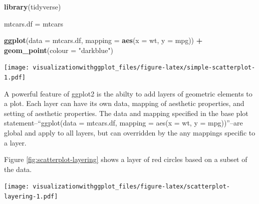 \documentclass[]{krantz}
\makeatletter
\newenvironment{Shaded}{\begin{snugshade}}{\end{snugshade}}
\newcommand{\DataTypeTok}[1]{\textcolor[rgb]{0.13,0.29,0.53}{#1}}
\newcommand{\DecValTok}[1]{\textcolor[rgb]{0.00,0.00,0.81}{#1}}
\newcommand{\KeywordTok}[1]{\textcolor[rgb]{0.13,0.29,0.53}{\textbf{#1}}}
\newcommand{\NormalTok}[1]{#1}
\newcommand{\OperatorTok}[1]{\textcolor[rgb]{0.81,0.36,0.00}{\textbf{#1}}}
\newcommand{\StringTok}[1]{\textcolor[rgb]{0.31,0.60,0.02}{#1}}
\newenvironment{kframe}{%
\medskip{}
\setlength{\fboxsep}{.8em}
 \def\at@end@of@kframe{}%
 \ifinner\ifhmode%
  \def\at@end@of@kframe{\end{minipage}}%
  \begin{minipage}{\columnwidth}%
 \fi\fi%
 \def\FrameCommand##1{\hskip\@totalleftmargin \hskip-\fboxsep
 \colorbox{shadecolor}{##1}\hskip-\fboxsep
     \hskip-\linewidth \hskip-\@totalleftmargin \hskip\columnwidth}%
 \MakeFramed {\advance\hsize-\width
   \@totalleftmargin\z@ \linewidth\hsize
   \@setminipage}}%
 {\par\unskip\endMakeFramed%
 \at@end@of@kframe}
\renewenvironment{Shaded}{\begin{kframe}}{\end{kframe}}
\makeatother
\begin{document}
\begin{Shaded}
\begin{Highlighting}[]
\KeywordTok{library}\NormalTok{(tidyverse)}

\NormalTok{mtcars.df =}\StringTok{ }\NormalTok{mtcars}

\KeywordTok{ggplot}\NormalTok{(}\DataTypeTok{data =}\NormalTok{ mtcars.df, }\DataTypeTok{mapping =} \KeywordTok{aes}\NormalTok{(}\DataTypeTok{x =}\NormalTok{ wt, }\DataTypeTok{y =}\NormalTok{ mpg)) }\OperatorTok{+}
\StringTok{  }\KeywordTok{geom_point}\NormalTok{(}\DataTypeTok{colour =} \StringTok{"darkblue"}\NormalTok{)}
\end{Highlighting}
\end{Shaded}

\texttt{[image: visualizationwithggplot\_files/figure-latex/simple-scatterplot-1.pdf]}

A powerful feature of ggplot2 is the abilty to add layers of geometric elements to a plot. Each layer can have its own data, mapping of aesthetic properties, and setting of aesthetic properties. The data and mapping specified in the base plot statement--``ggplot(data = mtcars.df, mapping = aes(x = wt, y = mpg))''--are global and apply to all layers, but can overridden by the any mappings specific to a layer.

Figure \ref{fig:scatterplot-layering} shows a layer of red circles based on a subset of the data.

\begin{Shaded}
\end{Shaded}

\texttt{[image: visualizationwithggplot\_files/figure-latex/scatterplot-layering-1.pdf]}
\end{document}
